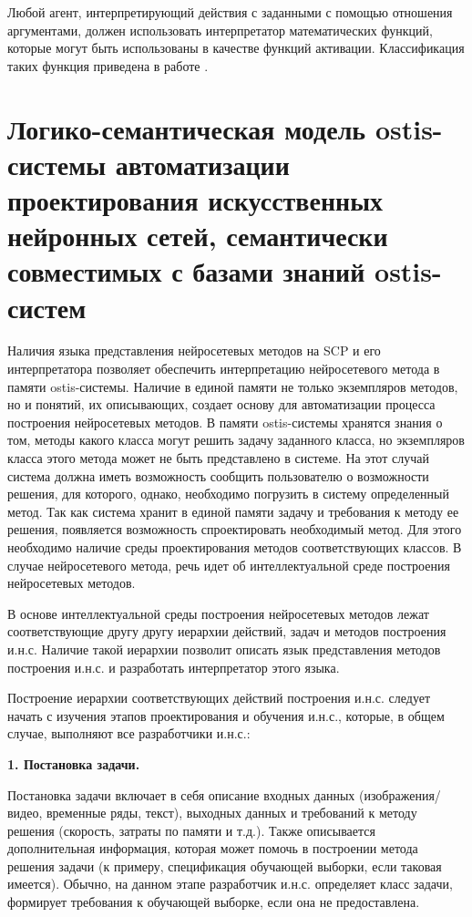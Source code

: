 Любой агент, интерпретирующий действия с заданными с помощью отношения  аргументами, должен использовать интерпретатор математических функций, которые могут быть использованы в качестве функций активации. Классификация таких функция приведена в работе .


\section{Логико-семантическая модель ostis-системы автоматизации проектирования искусственных нейронных сетей, семантически совместимых с базами знаний ostis-систем}
\label{sec_chapter_ann_framework}

Наличия языка представления нейросетевых методов на SCP и его интерпретатора позволяет обеспечить интерпретацию нейросетевого метода в памяти ostis-системы. Наличие в единой памяти не только экземпляров методов, но и понятий, их описывающих, создает основу для автоматизации процесса построения нейросетевых методов. В памяти ostis-системы хранятся знания о том, методы какого класса могут решить задачу заданного класса, но экземпляров класса этого метода может не быть представлено в системе. На этот случай система должна иметь возможность сообщить пользователю о возможности решения, для которого, однако, необходимо погрузить в систему определенный метод. Так как система хранит в единой памяти задачу и требования к методу ее решения, появляется возможность спроектировать необходимый метод. Для этого необходимо наличие среды проектирования методов соответствующих классов. В случае нейросетевого метода, речь идет об интеллектуальной среде построения нейросетевых методов.

В основе интеллектуальной среды построения нейросетевых методов лежат соответствующие другу другу иерархии действий, задач и методов построения и.н.с. Наличие такой иерархии позволит описать язык представления методов построения и.н.с. и разработать интерпретатор этого языка.

Построение иерархии соответствующих действий построения и.н.с. следует начать с изучения этапов проектирования и обучения и.н.с., которые, в общем случае, выполняют все разработчики и.н.с.:


\textbf{1. Постановка задачи. }

Постановка задачи включает в себя описание входных данных (изображения/видео, временные ряды, текст), выходных данных и требований к методу решения (скорость, затраты по памяти и т.д.). Также описывается дополнительная информация, которая может помочь в построении метода решения задачи (к примеру, спецификация обучающей выборки, если таковая имеется). Обычно, на данном этапе разработчик и.н.с. определяет класс задачи, формирует требования к обучающей выборке, если она не предоставлена.


